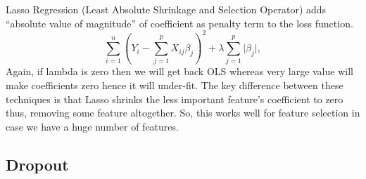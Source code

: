 Lasso Regression (Least Absolute Shrinkage and Selection Operator) adds
``absolute value of magnitude'' of coefficient as penalty term to the loss function.
\begin{equation}
	\label{equ:lasso_regresson}
	\sum_{i=1}^{n}(Y_{i}-\sum_{j=1}^{p}X_{ij}\beta_{j})^{2} + \lambda \sum_{j=1}^{p}
	\vert \beta_{j} \vert,
\end{equation}
Again, if lambda is zero then we will get back OLS whereas very large value will make coefficients 
zero hence it will under-fit.
The key difference between these techniques is that Lasso shrinks the less important feature’s 
coefficient to zero thus, removing some feature altogether. 
So, this works well for feature selection in case we have a huge number of features.

\subsection{Dropout}
